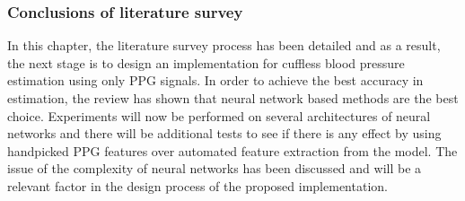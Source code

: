 \subsubsection{Conclusions of literature survey}
In this chapter, the literature survey process has been detailed and as a result, the next stage is to 
design an implementation for cuffless blood pressure estimation using only PPG signals. In order to achieve 
the best accuracy in estimation, the review has shown that neural network based methods are the best choice. 
Experiments will now be performed on several architectures of neural networks and there will be additional tests to see 
if there is any effect by using handpicked PPG features over automated feature extraction from the model. The issue of the complexity of neural networks has been discussed and will be a relevant factor in the design 
process of the proposed implementation.
